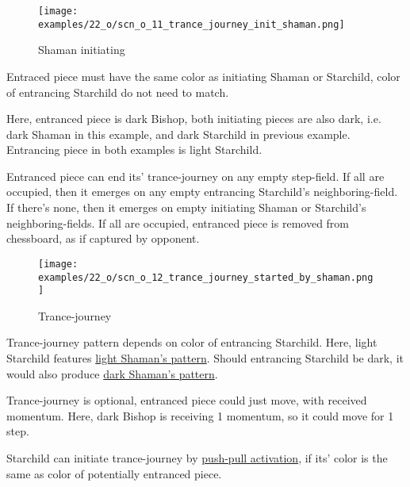 \vspace*{-0.1\baselineskip}
\noindent
\begin{wrapfigure}[10]{l}{0.4\textwidth}
\centering
\texttt{[image: examples/22\_o/scn\_o\_11\_trance\_journey\_init\_shaman.png]}
\caption{Shaman initiating}
\label{fig:scn_o_11_trance_journey_init_shaman}
\end{wrapfigure}
Entraced piece must have the same color as initiating Shaman or Starchild, color of
entrancing Starchild do not need to match.

Here, entranced piece is dark Bishop, both initiating pieces are also dark, i.e. dark Shaman
in this example, and dark Starchild in previous example. Entrancing piece in both examples
is light Starchild.

Entranced piece can end its' trance-journey on any empty step-field. If all are occupied, then it emerges
on any empty entrancing Starchild's neighboring-field. If there's none, then it emerges on empty initiating
Shaman or Starchild's neighboring-fields. If all are occupied, entranced piece is removed from chessboard,
as if captured by opponent.

\clearpage %

\vspace*{-3.1\baselineskip}
\noindent
\begin{figure}[!h]
\texttt{[image: examples/22\_o/scn\_o\_12\_trance\_journey\_started\_by\_shaman.png]}
\caption{Trance-journey}
\label{fig:scn_o_12_trance_journey_started_by_shaman}
\end{figure}

Trance-journey pattern depends on color of entrancing Starchild. Here, light Starchild features
\hyperref[fig:scn_cot_14_light_shaman_trance_journey]{light Shaman's pattern}. Should entrancing
Starchild be dark, it would also produce
\hyperref[fig:scn_cot_16_dark_shaman_trance_journey]{dark Shaman's pattern}.

Trance-journey is optional, entranced piece could just move, with received momentum.
Here, dark Bishop is receiving 1 momentum, so it could move for 1 step.

\clearpage %

Starchild can initiate trance-journey by
\hyperref[sec:Terms/Push-pull activation]{push-pull activation},
if its' color is the same as color of potentially entranced piece.

